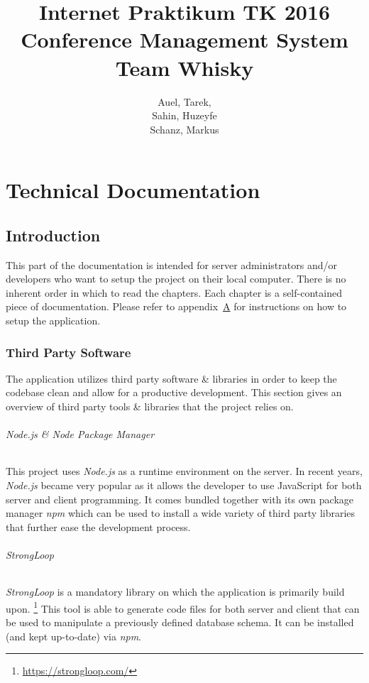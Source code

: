 \documentclass[nochapterpage,nopartpage,noheadingspace,numbersubsubsec,bigchapter,colorback,accentcolor=tud9c,10pt]{tudreport}
\title{Internet Praktikum TK 2016\\ Conference Management System\\ Team Whisky}
\subtitle{Auel, Tarek,\\ Sahin, Huzeyfe\\ Schanz, Markus}
\begin{document}
\maketitle
\tableofcontents



\part{Technical Documentation}
\label{part:tech}

  \chapter{Introduction}
  \label{ch:tech:intro}

    This part of the documentation is intended for server administrators and/or developers who want to setup the project on their local computer. There is no inherent order in which to read the chapters. Each chapter is a self-contained piece of documentation. Please refer to appendix~\hyperref[ch:appendix:setup]{A} for instructions on how to setup the application.

  \section{Third Party Software}
  \label{sec:tech:3rd-party}

    The application utilizes third party software \& libraries in order to keep the codebase clean and allow for a productive development. This section gives an overview of third party tools \& libraries that the project relies on.

  \paragraph{Node.js \& Node Package Manager}
    This project uses \emph{Node.js} as a runtime environment on the server. In recent years, \emph{Node.js} became very popular as it allows the developer to use JavaScript for both server and client programming. It comes bundled together with its own package manager \emph{npm} which can be used to install a wide variety of third party libraries that further ease the development process.

  \paragraph{StrongLoop}
    \emph{StrongLoop} is a mandatory library on which the application is primarily build upon.%
    \footnote{\url{https://strongloop.com/}}
    This tool is able to generate code files for both server and client that can be used to manipulate a previously defined database schema. It can be installed (and kept up-to-date) via \emph{npm}.%
\end{document}
